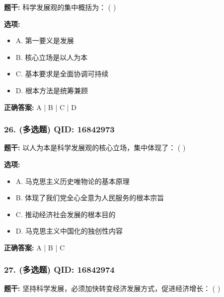 \documentclass[12pt,UTF8]{ctexart}
\begin{document}
\textbf{题干:}
科学发展观的集中概括为： ( )

\textbf{选项:}
\begin{itemize}[leftmargin=*]

  \item A. 第一要义是发展

  \item B. 核心立场是以人为本

  \item C. 基本要求是全面协调可持续

  \item D. 根本方法是统筹兼顾

\end{itemize}

\textbf{正确答案:}
A | B | C | D

\vspace{0.3em}\hrulefill\vspace{0.7em}

\subsubsection*{26. (多选题) \small QID: 16842973}

\textbf{题干:}
以人为本是科学发展观的核心立场，集中体现了： ( )

\textbf{选项:}
\begin{itemize}[leftmargin=*]

  \item A. 马克思主义历史唯物论的基本原理

  \item B. 体现了我们党全心全意为人民服务的根本宗旨

  \item C. 推动经济社会发展的根本目的

  \item D. 马克思主义中国化的独创性内容

\end{itemize}

\textbf{正确答案:}
A | B | C

\vspace{0.3em}\hrulefill\vspace{0.7em}

\subsubsection*{27. (多选题) \small QID: 16842974}

\textbf{题干:}
坚持科学发展，必须加快转变经济发展方式，促进经济增长： ( )
\end{document}
